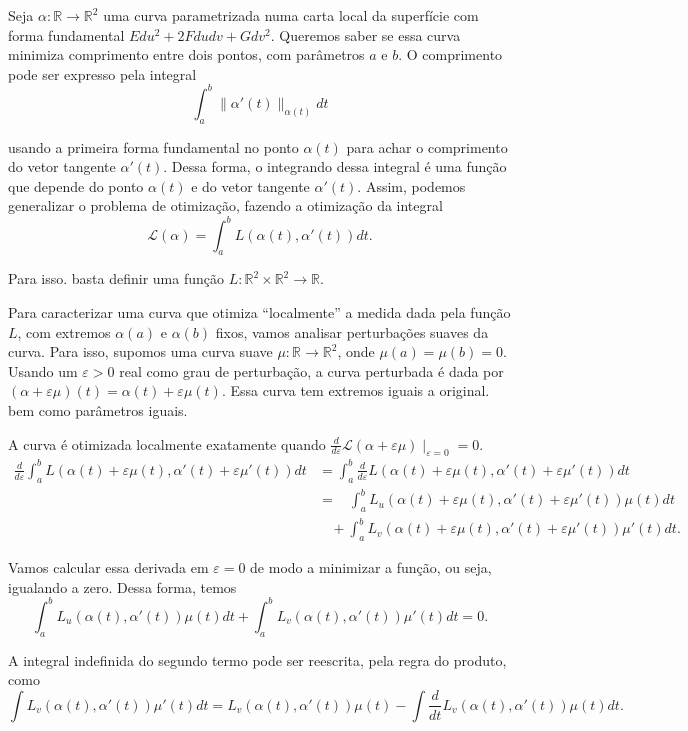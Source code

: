 \documentclass{article}
\begin{document}
Seja $\alpha : \mathbb{R} \to \mathbb{R}^2$ uma curva parametrizada numa carta local da superfície com forma fundamental $Edu^2 + 2Fdudv + Gdv^2$. Queremos saber se essa curva minimiza comprimento entre dois pontos, com parâmetros $a$ e $b$. O comprimento pode ser expresso pela integral
\[\int_{a}^{b} \|\alpha'(t)\|_{\alpha(t)} dt\]

usando a primeira forma fundamental no ponto $\alpha(t)$ para achar o comprimento do vetor tangente $\alpha'(t)$. Dessa forma, o integrando dessa integral é uma função que depende do ponto $\alpha(t)$ e do vetor tangente $\alpha'(t)$. Assim, podemos generalizar o problema de otimização, fazendo a otimização da integral
\[\mathcal{L}(\alpha) = \int_{a}^{b} L(\alpha(t), \alpha'(t)) dt.\]

Para isso. basta definir uma função $L : \mathbb{R}^2 \times \mathbb{R}^2 \to \mathbb{R}$.

Para caracterizar uma curva que otimiza ``localmente'' a medida dada pela função $L$, com extremos $\alpha(a)$ e $\alpha(b)$ fixos, vamos analisar perturbações suaves da curva. Para isso, supomos uma curva suave $\mu : \mathbb{R} \to \mathbb{R}^2$, onde $\mu(a) = \mu(b) = 0$. Usando um $\varepsilon > 0$ real como grau de perturbação, a curva perturbada é dada por $(\alpha + \varepsilon \mu)(t) = \alpha(t) + \varepsilon \mu(t)$. Essa curva tem extremos iguais a original. bem como parâmetros iguais.

A curva é otimizada localmente exatamente quando $\frac{d}{d\varepsilon}\mathcal{L}(\alpha + \varepsilon \mu)  \mid_{\varepsilon = 0} = 0$.
\begin{align*}
    \frac{d}{d\varepsilon} \int_{a}^{b} L(\alpha(t) + \varepsilon \mu (t), \alpha'(t) + \varepsilon \mu'(t)) dt & = \int_{a}^{b} \frac{d}{d\varepsilon} L(\alpha(t) + \varepsilon \mu (t), \alpha'(t) + \varepsilon \mu'(t)) dt \\
    & = ~~~~ \int_{a}^{b} L_u(\alpha(t) + \varepsilon \mu (t), \alpha'(t) + \varepsilon \mu'(t))\mu(t) dt \\
    & ~~~~ + \int_{a}^{b} L_v(\alpha(t) + \varepsilon \mu (t), \alpha'(t) + \varepsilon \mu'(t))\mu'(t) dt.
\end{align*}

Vamos calcular essa derivada em $\varepsilon = 0$ de modo a minimizar a função, ou seja, igualando a zero. Dessa forma, temos
\[\int_{a}^{b} L_u(\alpha(t), \alpha'(t))\mu(t) dt + \int_{a}^{b} L_v(\alpha(t), \alpha'(t))\mu'(t) dt = 0.\]

A integral indefinida do segundo termo pode ser reescrita, pela regra do produto, como
\[\int L_v(\alpha(t), \alpha'(t))\mu'(t) dt = L_v(\alpha(t), \alpha'(t))\mu(t) - \int \frac{d}{dt}L_v(\alpha(t), \alpha'(t))\mu(t)dt.\]
\end{document}
